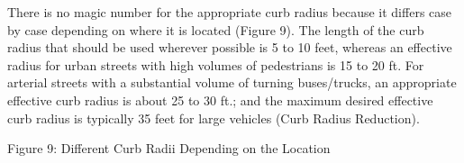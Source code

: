 There is no magic number for the appropriate curb radius because it differs case by case depending on where it is located (Figure 9). The length of the curb radius that should be used wherever possible is 5 to 10 feet, whereas an effective radius for urban streets with high volumes of pedestrians is 15 to 20 ft. For arterial streets with a substantial volume of turning buses/trucks, an appropriate effective curb radius is about 25 to 30 ft.; and the maximum desired effective curb radius is typically 35 feet for large vehicles (Curb Radius Reduction).

Figure 9: Different Curb Radii Depending on the Location